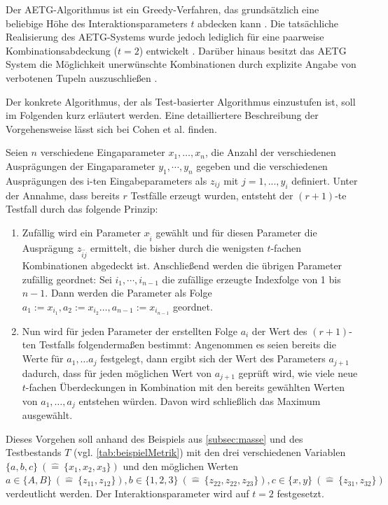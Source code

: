 Der AETG-Algorithmus ist ein Greedy-Verfahren, das grundsätzlich eine beliebige Höhe des Interaktionsparameters $t$ abdecken kann \cite{cohen1997aetg}. Die tatsächliche Realisierung des AETG-Systems wurde jedoch lediglich für eine paarweise Kombinationsabdeckung ($t = 2$) entwickelt \cite{khalsa2014orchestrated}. Darüber hinaus besitzt das AETG System die Möglichkeit unerwünschte Kombinationen durch explizite Angabe von \glqq verbotenen Tupeln\grqq{} auszuschließen \cite{cohen1997aetg, khalsa2014orchestrated}.

Der konkrete Algorithmus, der als Test-basierter Algorithmus einzustufen ist, soll im Folgenden kurz erläutert werden. Eine detailliertere Beschreibung der Vorgehensweise lässt sich bei Cohen et al. \cite{cohen1997aetg} finden. 

Seien $n$ verschiedene Eingaparameter $x_1, \dots, x_n$, die Anzahl der verschiedenen Ausprägungen der Eingaparameter  $y_1, \cdots, y_n$ gegeben und die verschiedenen Ausprägungen des i-ten Eingabeparameters als $z_{ij}$ mit $j = 1,...,y_i$ definiert. Unter der Annahme, dass bereits $r$ Testfälle erzeugt wurden, entsteht der $(r+1)$-te Testfall durch das folgende Prinzip:
\begin{enumerate}
\item Zufällig wird ein Parameter $x_{\tilde{i}}$ gewählt und für diesen Parameter die Ausprägung $z_{\tilde{i}\tilde{j}}$ ermittelt, die bisher durch die wenigsten $t$-fachen Kombinationen abgedeckt ist. Anschließend werden die übrigen Parameter zufällig geordnet: Sei $i_1, \cdots, i_{n-1}$ die zufällige erzeugte Indexfolge von 1 bis $n-1$. Dann werden die Parameter als Folge $a_1 := x_{i_1}, a_2 := x_{i_2}  \dots, a_{n-1} := x_{i_{n-1}}$ geordnet.
\item Nun wird für jeden Parameter der erstellten Folge $a_i$ der Wert des $(r+1)$-ten Testfalls folgendermaßen bestimmt: Angenommen es seien bereits die Werte für $a_1, \dots a_j$ festgelegt, dann ergibt sich der Wert des Parameters $a_{j+1}$ dadurch, dass für jeden möglichen Wert von $a_{j+1}$ geprüft wird, wie viele neue $t$-fachen Überdeckungen in Kombination mit den bereits gewählten Werten von $a_1, \dots, a_j$ entstehen würden. Davon wird schließlich das Maximum ausgewählt.
\end{enumerate}

Dieses Vorgehen soll anhand des Beispiels aus \autoref{subsec:masse} und des Testbestands $T$ (vgl. \autoref{tab:beispielMetrik}) mit den drei verschiedenen Variablen $\{a,b,c\} ~ (\hat{=} ~ \{x_1, x_2, x_3\})$ und den möglichen Werten $a \in \{A,B\} ~ (\hat{=} ~ \{z_{11}, z_{12}\}), b \in \{1,2,3\} ~ (\hat{=} ~ \{z_{22}, z_{22}, z_{23}\}), c \in \{x,y\} ~ (\hat{=} ~ \{z_{31}, z_{32}\})$ verdeutlicht werden. Der Interaktionsparameter wird auf $t=2$ festgesetzt. 

